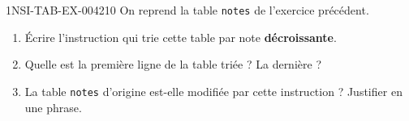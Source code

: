 \begin{exercice}{1NSI-TAB-EX-004}{2}{10}
On reprend la table \lstinline{notes} de l'exercice précédent.
\begin{enumerate}
  \item Écrire l'instruction qui trie cette table par note \textbf{décroissante}.
  \item Quelle est la première ligne de la table triée ? La dernière ?
  \item La table \lstinline{notes} d'origine est-elle modifiée par cette instruction ? Justifier en une phrase.
\end{enumerate}
\end{exercice}
